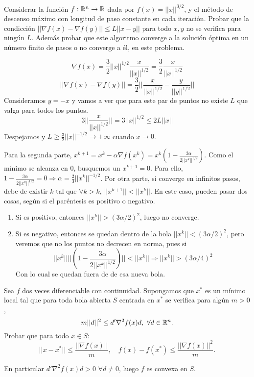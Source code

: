 \documentclass[twoside]{article}
\begin{document}
\begin{ejercicio}{7}
Considerar la función $f:\mathbb{R}^n\to\mathbb{R}$ dada por $f(x)=||x||^{3/2}$, y el método de descenso máximo con longitud de paso constante en cada iteración. Probar que la condicción $||\nabla f(x)-\nabla f(y)||\leq L||x-y||$ para todo $x,y$ no se verifica para ningún $L$. Además probar que este algoritmo converge a la solución óptima en un número finito de pasos o no converge a él, en este problema.
\end{ejercicio}
\begin{solucion}
$$\nabla f(x)=\frac{3}{2}||x||^{1/2}\frac{x}{||x||^{1/2}}=\frac{3}{2}\frac{x}{||x||^{1/2}}$$
$$||\nabla f(x)-\nabla f(y)||=\frac{3}{2}||\frac{x}{||x||^{1/2}}-\frac{y}{||y||^{1/2}}||$$
Consideramos $y=-x$ y vamos a ver que para este par de puntos no existe $L$ que valga para todos los puntos.
$$3||\frac{x}{||x||^{1/2}}||=3||x||^{1/2}\leq 2L||x||$$
Despejamos y $L\geq\frac{3}{2}||x||^{-1/2}\to +\infty$ cuando $x\to 0$.

Para la segunda parte, $x^{k+1}=x^k-\alpha\nabla f(x^k)=x^k\left(1-\frac{3\alpha}{2||x^k||^{1/2}}\right)$. Como el mínimo se alcanza en 0, busquemos un $x^{k+1}=0$. Para ello, $1-\frac{3\alpha}{2||x^k||^{1/2}}=0\Rightarrow \alpha=\frac{2}{3}||x^k||^{-1/2}$. 
Por otra parte, si converge en infinitos pasos, debe de existir $\overline{k}$ tal que $\forall k>\overline{k}$, $||x^{k+1}||<||x^k||$. En este caso, pueden pasar dos cosas, según si el paréntesis es positivo o negativo.
\begin{enumerate}
\item Si es positivo, entonces $||x^k||>(3\alpha/2)^2$, luego no converge. 
\item Si es negativo, entonces se quedan dentro de la bola $||x^k||<(3\alpha/2)^2$, pero veremos que no los puntos no decrecen en norma, pues si 
$$||x^k||||\left(1-\frac{3\alpha}{2||x^k||^{1/2}}\right)||<||x^k||\Rightarrow ||x^k||>(3\alpha/4)^2$$
Con lo cual se quedan fuera de de esa nueva bola.
\end{enumerate}
\end{solucion}

\newpage

\begin{ejercicio}{8}
Sea $f$ dos veces diferenciable con continuidad. Supongamos que $x^*$ es un mínimo local tal que para toda bola abierta $S$ centrada en $x^*$ se verifica para algún $m>0$,
$$m||d||^2\leq d'\nabla^2f(x)d,\ \forall d\in\mathbb{R}^n.$$
Probar que para todo $x\in S$:
$$||x-x^*||\leq\frac{||\nabla f(x)||}{m},\quad f(x)-f(x^*)\leq\frac{||\nabla f(x)||^2}{m}.$$
\end{ejercicio}
\begin{solucion} En particular $d'\nabla^2f(x)d >0$ $\forall d\neq 0$, luego $f$ es convexa en $S$. 
\end{solucion}
\end{document}
